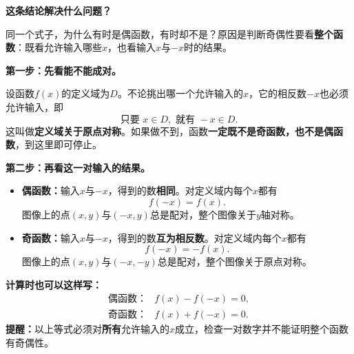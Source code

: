 \begin{statementbox}
\textbf{这条结论解决什么问题？}


\begin{center}

\end{center}




同一个式子，为什么有时是偶函数，有时却不是？原因是判断奇偶性要看\textbf{整个函数}：既看允许输入哪些$x$，也看输入$x$与$-x$时的结果。

\medskip
\textbf{第一步：先看能不能成对。}

设函数$f(x)$的定义域为$D$。不论挑出哪一个允许输入的$x$，它的相反数$-x$也必须允许输入，即
\[
\boxed{\text{只要 }x\in D,\text{ 就有 }-x\in D.}
\]
这叫做\textbf{定义域关于原点对称}。如果做不到，函数\textbf{一定既不是奇函数，也不是偶函数}，到这里即可停止。

\medskip
\end{statementbox}
\clearpage
\begin{statementbox}
\textbf{第二步：再看这一对输入的结果。}
\begin{itemize}[leftmargin=*,itemsep=0.35em]
\item \textbf{偶函数：}输入$x$与$-x$，得到的数\textbf{相同}。对定义域内每个$x$都有
\[\boxed{f(-x)=f(x).}\]
图像上的点$(x,y)$与$(-x,y)$总是配对，整个图像关于$y$轴对称。
\item \textbf{奇函数：}输入$x$与$-x$，得到的数\textbf{互为相反数}。对定义域内每个$x$都有
\[\boxed{f(-x)=-f(x).}\]
图像上的点$(x,y)$与$(-x,-y)$总是配对，整个图像关于原点对称。
\end{itemize}

\textbf{计算时也可以这样写：}
\[
\begin{array}{ll}
\text{偶函数：}&f(x)-f(-x)=0,\\[2pt]
\text{奇函数：}&f(x)+f(-x)=0.
\end{array}
\]
\textbf{提醒：}以上等式必须对\textbf{所有}允许输入的$x$成立，检查一对数字并不能证明整个函数有奇偶性。


\end{statementbox}
